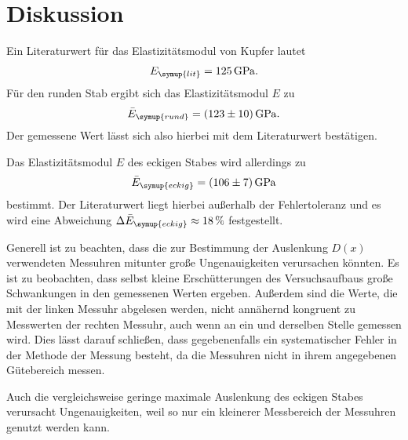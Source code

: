 \section{Diskussion}
\label{sec:Diskussion}
Ein Literaturwert \cite[S. 829 / E77]{czichos} für das Elastizitätsmodul von Kupfer lautet
\begin{gather}
    E_{\symup{lit}} = \qty{125}{\giga\pascal}. \notag
\end{gather}
Für den runden Stab ergibt sich das Elastizitätsmodul $E$ zu
\begin{gather}
    \bar{E}_{\symup{rund}} = \qty{123+-10}{\giga\pascal}. \notag
\end{gather}
Der gemessene Wert lässt sich also hierbei mit dem Literaturwert bestätigen.

Das Elastizitätsmodul $E$ des eckigen Stabes wird allerdings zu 
\begin{gather}
    \bar{E}_{\symup{eckig}} = \qty{106+-7}{\giga\pascal} \notag
\end{gather}
bestimmt. Der Literaturwert liegt hierbei außerhalb der Fehlertoleranz und es wird eine Abweichung 
$\Delta \bar{E}_{\symup{eckig}} \approx \qty{18}\percent$ festgestellt.

Generell ist zu beachten, dass die zur Bestimmung der Auslenkung $D(x)$ verwendeten Messuhren mitunter große Ungenauigkeiten
verursachen könnten. Es ist zu beobachten, dass selbst kleine Erschütterungen des Versuchsaufbaus große Schwankungen in den gemessenen Werten ergeben.
Außerdem sind die Werte, die mit der linken Messuhr abgelesen werden, nicht annähernd kongruent zu Messwerten der rechten Messuhr, 
auch wenn an ein und derselben Stelle gemessen wird. Dies lässt darauf schließen, dass gegebenenfalls ein systematischer Fehler
in der Methode der Messung besteht, da die Messuhren nicht in ihrem angegebenen Gütebereich messen.

Auch die vergleichsweise geringe maximale Auslenkung des eckigen Stabes verursacht Ungenauigkeiten, weil so nur ein kleinerer
Messbereich der Messuhren genutzt werden kann.

